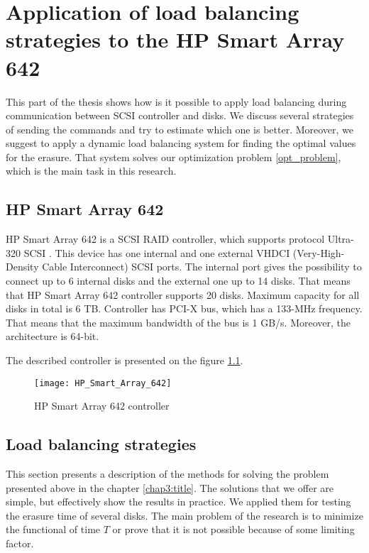 \chapter{Application of load balancing strategies to the HP Smart Array 642}
\label{chap4:title}

This part of the thesis shows how is it possible to apply load balancing during communication between SCSI controller and disks. We discuss several strategies of sending the commands and try to estimate which one is better. Moreover, we suggest to apply a dynamic load balancing system for finding the optimal values for the erasure. That system solves our optimization problem \ref{opt_problem}, which is the main task in this research.

\section{HP Smart Array 642}
HP Smart Array 642 is a SCSI RAID controller, which supports protocol Ultra-320 SCSI \cite{hp_642_desc}. This device has one internal and one external VHDCI (Very-High-Density Cable Interconnect) SCSI ports. The internal port gives the possibility to connect up to 6 internal disks and the external one up to 14 disks. That means that HP Smart Array 642 controller supports 20 disks. Maximum capacity for all disks in total is 6 TB. Controller has PCI-X bus, which has a 133-MHz frequency. That means that the maximum bandwidth of the bus is 1 GB/s. Moreover, the architecture is 64-bit.

The described controller is presented on the figure \ref{fig:HP_Smart_Array_642}.
\begin{figure}[h]
\begin{center}
  \texttt{[image: HP\_Smart\_Array\_642]}
\end{center}
  \caption{HP Smart Array 642 controller}
  \label{fig:HP_Smart_Array_642}
\end{figure}


\section{Load balancing strategies}
This section presents a description of the methods for solving the problem presented above in the chapter \ref{chap3:title}. The solutions that we offer are simple, but effectively show the results in practice. We applied them for testing the erasure time of several disks. The main problem of the research is to minimize the functional of time $T$ or prove that it is not possible because of some limiting factor.

